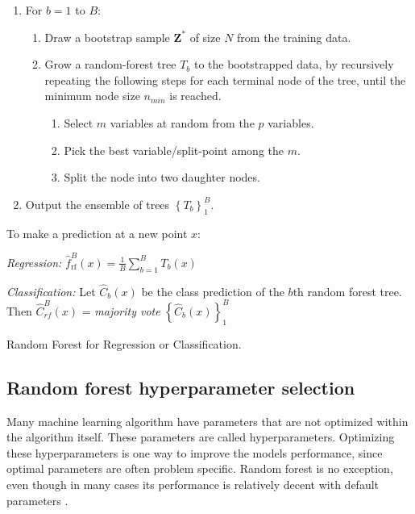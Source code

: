 \begin{algorithm}
    \footnotesize
    \begin{minipage}{.92\linewidth}
    \begin{enumerate}
        \item For $b = 1$ to $B$:
        \begin{enumerate}
            \item Draw a bootstrap sample $\bm{Z}^{*}$ of size $N$ from the training data.
            \item Grow a random-forest tree $T_b$ to the bootstrapped data, by recursively repeating the following steps for each terminal node of the tree, until the minimum node size $n_{min}$ is reached.
            \begin{enumerate}
                \item Select $m$ variables at random from the $p$ variables.
                \item Pick the best variable/split-point among the $m$.
                \item Split the node into two daughter nodes.
            \end{enumerate}
        \end{enumerate}
        \item Output the ensemble of trees $\left\{ T _ { b } \right\} _ { 1 } ^ { B }$.
    \end{enumerate}
    To make a prediction at a new point $x$:

    \textit{Regression:} $\hat { f } _ { \mathrm { rf } } ^ { B } ( x ) = \frac { 1 } { B } \sum _ { b = 1 } ^ { B } T _ { b } ( x )$

    \textit{Classification:} Let $\hat { C } _ { b } ( x )$ be the class prediction of the $b$th random forest
    tree. Then $\hat{C} _ { r f } ^ { B } ( x )$ = \textit{majority vote} $\left\{ \hat { C } _ { b } ( x ) \right\} _ { 1 } ^ { B }$
    \end{minipage}
    \caption{\footnotesize Random Forest for Regression or Classification.}
    \label{alg:random_forest}
\end{algorithm}

\subsection{Random forest hyperparameter selection}
Many machine learning algorithm have parameters that are not optimized within the algorithm itself. These parameters are called hyperparameters. Optimizing these hyperparameters is one way to improve the models performance, since optimal parameters are often problem specific. Random forest is no exception, even though in many cases its performance is relatively decent with default parameters \cite{probst2018hyperparameters}.

